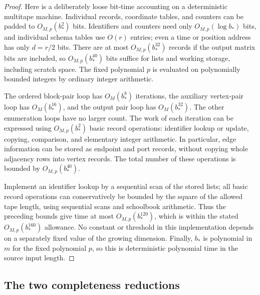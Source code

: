 \documentclass[11pt]{article}
\theoremstyle{definition}
\begin{document}
\begin{proof}
Here is a deliberately loose bit-time accounting on a deterministic
multitape machine.  Individual records, coordinate tables, and counters
can be padded to $O_{M,p}(b_*^2)$ bits.  Identifiers and counters need only
$O_{M,p}(\log b_*)$ bits, and individual schema tables use $O(r)$ entries;
even a time or position address has only $d=r/2$ bits.  There are at most
$O_{M,p}(b_*^{32})$ records if the output matrix bits are included, so
$O_{M,p}(b_*^{40})$ bits suffice for lists and working storage, including
scratch space.  The fixed polynomial $p$ is evaluated on polynomially
bounded integers by ordinary integer arithmetic.

The ordered block-pair loop has $O_M(b_*^8)$ iterations, the auxiliary
vertex-pair loop has $O_M(b_*^{16})$, and the output pair loop has
$O_M(b_*^{32})$.  The other enumeration loops have no larger count.
The work of each iteration can be expressed using
$O_{M,p}(b_*^2)$ basic record operations: identifier lookup or update,
copying, comparison, and elementary integer arithmetic.  In particular,
edge information can be stored as endpoint and port records, without
copying whole adjacency rows into vertex records.  The total number of
these operations is bounded by $O_{M,p}(b_*^{40})$.

Implement an identifier lookup by a sequential scan of the stored lists;
all basic record operations can conservatively be bounded by the square
of the allowed tape length, using sequential scans and schoolbook
arithmetic.  Thus the preceding bounds give time at most
$O_{M,p}(b_*^{120})$, which is within the stated
$O_{M,p}(b_*^{160})$ allowance.  No constant or threshold in this
implementation depends on a separately fixed value of the growing
dimension.  Finally, $b_*$ is polynomial in $m$ for the fixed polynomial
$p$, so this is deterministic polynomial time in the source input length.
\end{proof}


\subsection{The two completeness reductions}
\end{document}
